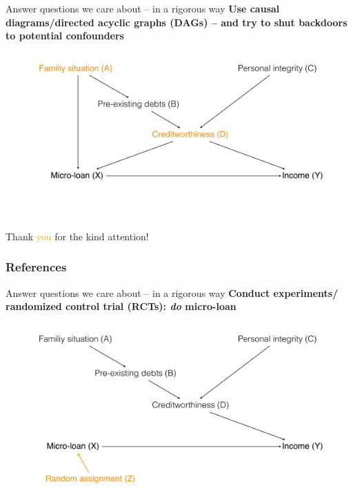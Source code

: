 \documentclass[12pt,english,dvipsnames,aspectratio=169, handout]{beamer}
\begin{document}
\begin{frame}{Answer questions we care about -- in a rigorous way}
\textbf{Use causal diagrams/directed acyclic graphs (DAGs) \cite{pearl_book_2018} -- and try to shut backdoors to potential confounders}
    \begin{figure}
    \includegraphics[width=.8\textwidth]{../04-figures/01/04-dag_micfin_c}
    \end{figure}
\end{frame}


\begin{frame}
\begin{center}
    \Huge Thank \textcolor{orange}{you} for the kind attention!
\end{center}
\end{frame}


\begin{frame}
\frametitle{References}


\vspace{5cm}
\end{frame}

\begin{frame}{Answer questions we care about -- in a rigorous way}
\textbf{Conduct experiments/ randomized control trial (RCTs): \emph{do} micro-loan}
    \begin{figure}
    \includegraphics[width=.8\textwidth]{../04-figures/01/05-dag_micfin_r}
    \end{figure}
\end{frame}
\end{document}
